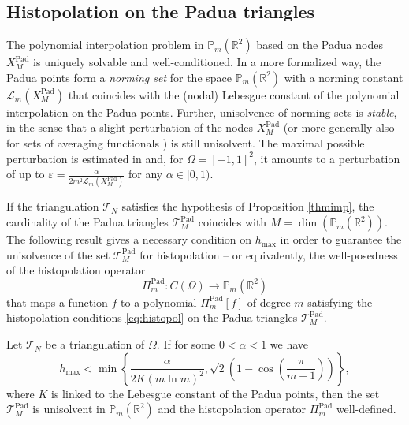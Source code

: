 \documentclass{svjour3}
\newcommand{\T}{\mathcal{T}}
\renewcommand{\P}{\mathbb{P}} %
\begin{document}
\subsection{Histopolation on the Padua triangles}

The polynomial interpolation problem in $\P_m\left(\mathbb{R}^2\right)$ based on the Padua nodes $ X_M^{\mathrm{Pad}} $ is uniquely solvable and well-conditioned. In a more formalized way, the Padua points form a \emph{norming set} \cite{NormingSet} for the space $ \P_m\left(\mathbb{R}^2\right)$ with a norming constant $ \mathscr{L}_m \left(X_M^{\mathrm{Pad}}\right)$ that coincides with the (nodal) Lebesgue constant of the polynomial interpolation on the Padua points. Further, unisolvence of norming sets is \emph{stable}, in the sense that a slight perturbation of the nodes $ X_M^{\mathrm{Pad}} $ (or more generally also for sets of averaging functionals \cite{MockSegments}) is still unisolvent. The maximal possible perturbation is estimated in \cite[Proposition 1]{PiazzonVianello} and, for $ \Omega = [-1, 1]^2$, it amounts to a perturbation of up to $ \varepsilon = \frac{\alpha}{2 m^2 \mathscr{L}_m \left(X_M^{\mathrm{Pad}}\right)} $ for any $ \alpha \in [0,1) $.

If the triangulation $ \mathcal{T}_N$ satisfies the hypothesis of Proposition \ref{thmimp}, the cardinality of the Padua triangles $ \mathcal{T}_M^{\mathrm{Pad}} $ coincides with $ M = \dim \left(\P_m\left(\mathbb{R}^2\right)\right)$. The following result gives a necessary condition on $ h_{\max} $ in order to guarantee the unisolvence of the set $ \mathcal{T}_M^{\mathrm{Pad}} $ for histopolation -- or equivalently, the well-posedness of the histopolation operator
\begin{equation} \label{ea:histopolationPadua}
\Pi_{m}^{\mathrm{Pad}} : C (\Omega) \to \P_m\left(\mathbb{R}^2\right)
\end{equation}
that maps a function $f$ to a polynomial $\Pi_{m}^{\mathrm{Pad}}[f]$ of degree $m$ satisfying the histopolation conditions \eqref{eq:histopol} on the Padua triangles $\T_M^{\mathrm{Pad}}$.

\begin{proposition} \label{prop:stability}
	Let $ \mathcal{T}_N $ be a triangulation of $ \Omega $. If for some $0 < \alpha < 1$ we have
	\begin{equation} \label{eq:condhmax}
		h_{\max} < \min \left\{\frac{\alpha}{2 K \left(m \ln m\right)^2}, \sqrt{2} \left( 1 - \cos \left( \frac{\pi}{m+1} \right) \right) \right\}, 
		\end{equation}
where $K$ is linked to the Lebesgue constant of the Padua points, then
	the set $ \mathcal{T}_M^{\mathrm{Pad}} $ is unisolvent in $ \P_m \left(\mathbb{R}^2\right) $ and the histopolation operator $\Pi_{m}^{\mathrm{Pad}}$ well-defined.
\end{proposition}
\end{document}
